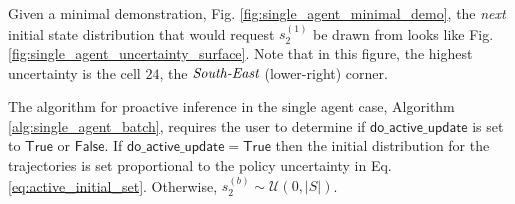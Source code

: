 \begin{figure}[htb]
        \begin{center}
        \end{center}
\end{figure}
Given a minimal demonstration, Fig. \ref{fig:single_agent_minimal_demo}, the \emph{next} initial state distribution that
 would request $s_2^{(1)}$ be drawn from looks like Fig. \ref{fig:single_agent_uncertainty_surface}. Note that
in this figure, the highest uncertainty is the cell $24$, the $\emph{South-East}$ (lower-right) corner.

\begin{figure}[htb]
        \begin{center}
        \end{center}
\end{figure}

The algorithm for proactive inference in the single agent case, Algorithm \ref{alg:single_agent_batch}, requires the
user to determine if $\mathsf{do\_active\_update}$ is set to $\mathsf{True}$ or $\mathsf{False}$. If
$\mathsf{do\_active\_update}=\mathsf{True}$ then the initial distribution for the trajectories is set proportional to
the policy uncertainty in Eq. \ref{eq:active_initial_set}. Otherwise, $s_2^{(b)} \sim \mathcal{U}(0,|S|)$.

